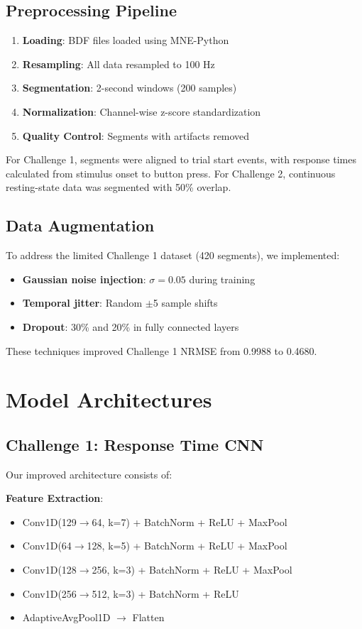 \documentclass[10pt,twocolumn]{article}
\begin{document}
\subsection{Preprocessing Pipeline}
\begin{enumerate}
    \item \textbf{Loading}: BDF files loaded using MNE-Python
    \item \textbf{Resampling}: All data resampled to 100 Hz
    \item \textbf{Segmentation}: 2-second windows (200 samples)
    \item \textbf{Normalization}: Channel-wise z-score standardization
    \item \textbf{Quality Control}: Segments with artifacts removed
\end{enumerate}

For Challenge 1, segments were aligned to trial start events, with response times calculated from stimulus onset to button press. For Challenge 2, continuous resting-state data was segmented with 50\% overlap.

\subsection{Data Augmentation}
To address the limited Challenge 1 dataset (420 segments), we implemented:
\begin{itemize}
    \item \textbf{Gaussian noise injection}: $\sigma = 0.05$ during training
    \item \textbf{Temporal jitter}: Random $\pm$5 sample shifts
    \item \textbf{Dropout}: 30\% and 20\% in fully connected layers
\end{itemize}

These techniques improved Challenge 1 NRMSE from 0.9988 to 0.4680.

\section{Model Architectures}

\subsection{Challenge 1: Response Time CNN}
Our improved architecture consists of:

\textbf{Feature Extraction}:
\begin{itemize}
    \item Conv1D(129$\rightarrow$64, k=7) + BatchNorm + ReLU + MaxPool
    \item Conv1D(64$\rightarrow$128, k=5) + BatchNorm + ReLU + MaxPool
    \item Conv1D(128$\rightarrow$256, k=3) + BatchNorm + ReLU + MaxPool
    \item Conv1D(256$\rightarrow$512, k=3) + BatchNorm + ReLU
    \item AdaptiveAvgPool1D $\rightarrow$ Flatten
\end{itemize}
\end{document}
